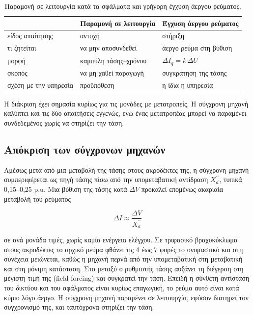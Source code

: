 \begin{table}[!htbp]
\centering
\begin{tabular}{lll}
\hline
 & Παραμονή σε λειτουργία & Έγχυση άεργου ρεύματος \\
\hline
είδος απαίτησης & αντοχή & στήριξη \\
τι ζητείται & να μην αποσυνδεθεί & άεργο ρεύμα στη βύθιση \\
μορφή & καμπύλη τάσης--χρόνου & $\Delta I_q = k\,\Delta U$ \\
σκοπός & να μη χαθεί παραγωγή & συγκράτηση της τάσης \\
σχέση με την υπηρεσία & προϋπόθεση & η ίδια η υπηρεσία \\
\hline
\end{tabular}
\caption{Παραμονή σε λειτουργία κατά τα σφάλματα και γρήγορη έγχυση άεργου ρεύματος.}
\label{tab:frt-vs-q}
\end{table}

Η διάκριση έχει σημασία κυρίως για τις μονάδες με μετατροπείς. Η σύγχρονη μηχανή καλύπτει και
τις δύο απαιτήσεις εγγενώς, ενώ ένας μετατροπέας μπορεί να παραμένει συνδεδεμένος χωρίς να
στηρίζει την τάση.

\subsection{Απόκριση των σύγχρονων μηχανών}
\label{sec:sm-response}

Αμέσως μετά από μια μεταβολή της τάσης στους ακροδέκτες της, η σύγχρονη μηχανή συμπεριφέρεται
ως πηγή τάσης πίσω από την υπομεταβατική αντίδραση $X_d^{\prime\prime}$, τυπικά 0,15--0,25 p.u.
Μια βύθιση της τάσης κατά $\Delta V$ προκαλεί επομένως ακαριαία μεταβολή του ρεύματος

\begin{equation}
\Delta I \approx \frac{\Delta V}{X_d^{\prime\prime}}
\label{eq:sm-dI}
\end{equation}

σε ανά μονάδα τιμές, χωρίς καμία ενέργεια ελέγχου. Σε τριφασικό βραχυκύκλωμα στους ακροδέκτες
το αρχικό ρεύμα φθάνει τις 4 έως 7 φορές το ονομαστικό και στη συνέχεια μειώνεται, καθώς η
μηχανή περνά από την υπομεταβατική στη μεταβατική και στη μόνιμη κατάσταση. Στο μεταξύ ο
ρυθμιστής τάσης αυξάνει τη διέγερση στη μέγιστη τιμή της (field forcing) και συγκρατεί την
τάση. Επειδή η σύνθετη αντίσταση του δικτύου και του σφάλματος είναι κυρίως επαγωγική, το ρεύμα
αυτό είναι κατά κύριο λόγο άεργο. Η σύγχρονη μηχανή παραμένει σε λειτουργία, εφόσον διατηρεί
τον συγχρονισμό της, και ταυτόχρονα στηρίζει την τάση.

